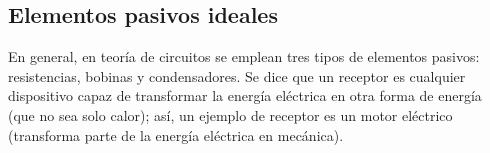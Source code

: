 	
	
	
	
	
	
	\subsection{Elementos pasivos ideales}
	
	En general, en teoría de circuitos se emplean tres tipos de elementos pasivos: resistencias, bobinas y condensadores. Se dice que un receptor es cualquier dispositivo capaz de transformar la energía eléctrica en otra forma de energía (que no sea solo calor); así, un ejemplo de receptor es un motor eléctrico (transforma parte de la energía eléctrica en mecánica).  
	
